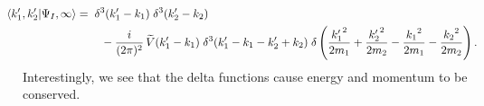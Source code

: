 \documentclass[11pt]{article}
\newcommand{\braket}[2]{\left\langle#1|#2\right\rangle}
\theoremstyle{theorem}
\theoremstyle{remark}
\theoremstyle{step}
\theoremstyle{gap}
\begin{document}
\begin{align}
\hspace{-1.5em}\braket{k_1^\prime, k_2^\prime}{\Psi_I, \infty}
=& \;\;\delta^3(k_1^\prime - k_1)\;\delta^3(k_2^\prime - k_2) \nonumber\\&\;\;\;\;- \frac{i}{(2\pi)^2}\, \widetilde{V}(k_1^\prime-k_1) \;\delta^3(k_1^\prime-k_1-k_2^\prime+k_2) \;\delta\left(\frac{{k_1^\prime}^2}{2m_1} + \frac{{k_2^\prime}^2}{2m_2} - \frac{{k_1}^2}{2m_1} - \frac{{k_2}^2}{2m_2}\right).
\end{align}
Interestingly, we see that the delta functions cause energy and momentum to be conserved.
\end{document}
